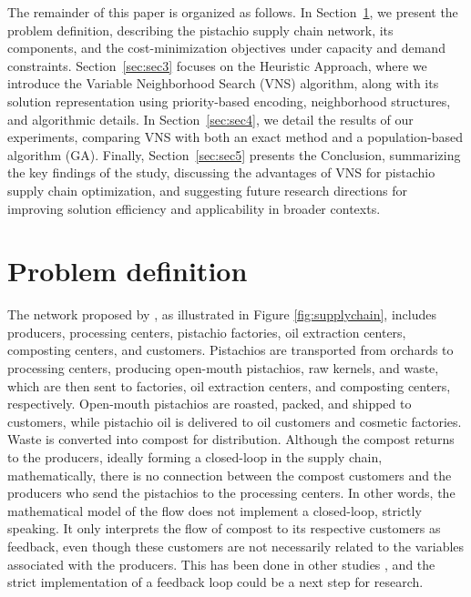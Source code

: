 \documentclass[sn-nature]{sn-jnl}%
\theoremstyle{thmstyleone}%
\theoremstyle{thmstyletwo}%
\theoremstyle{thmstylethree}%
\begin{document}
The remainder of this paper is organized as follows. In Section~\ref{sec:sec2}, we present the problem definition, describing the pistachio supply chain network, 
its components, and the cost-minimization objectives under capacity and demand constraints. Section~\ref{sec:sec3} focuses on the Heuristic Approach, where we 
introduce the Variable Neighborhood Search (VNS) algorithm, along with its solution representation using priority-based encoding, neighborhood 
structures, and algorithmic details. In Section~\ref{sec:sec4}, we detail the results of our experiments, comparing VNS with both an exact method 
and a population-based algorithm (GA). Finally, Section~\ref{sec:sec5} presents 
the Conclusion, summarizing the key findings of the study, discussing the advantages of VNS for pistachio supply chain optimization, and 
suggesting future research directions for improving solution efficiency and applicability in broader contexts.


\section{Problem definition}
\label{sec:sec2}

The network proposed by \cite{rajabi2023utilizing}, as illustrated in Figure \ref{fig:supplychain}, includes producers, processing centers, pistachio factories, 
oil extraction centers, composting centers, and customers. Pistachios are transported 
from orchards to processing centers, producing open-mouth pistachios, raw kernels, and 
waste, which are then sent to factories, oil extraction centers, and composting centers, respectively. 
Open-mouth pistachios are roasted, packed, and shipped to customers, while pistachio oil 
is delivered to oil customers and cosmetic factories. Waste is converted into compost for 
distribution. Although the compost returns to the producers, ideally forming a closed-loop in the supply chain, mathematically, there is no connection between the compost customers and the producers who send the pistachios to the processing centers. In other words, the mathematical model of the flow does not implement a closed-loop, strictly speaking. It only interprets the flow of compost to its respective customers as feedback, even though these customers are not necessarily related to the variables associated with the producers. This has been done in other studies \cite{pishvaee2010memetic,ahmadi2019integrated,banasik2016simple,gholian2023metaheuristic}, and the strict implementation of a feedback loop could be a next step for research.
\end{document}
